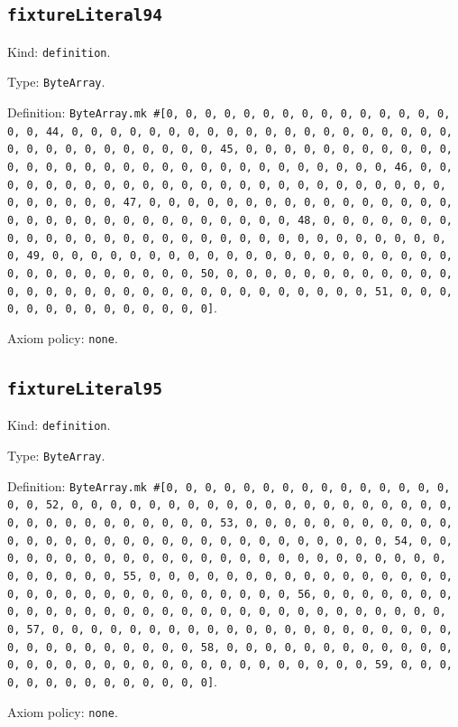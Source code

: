 \documentclass[11pt]{article}
\begin{document}
\subsection*{\texttt{fixtureLiteral94}}
\noindent Kind: \texttt{definition}.\par
\noindent Type: \texttt{ByteArray}.\par
\noindent Definition: \texttt{ByteArray.mk \#[0, 0, 0, 0, 0, 0, 0, 0, 0, 0, 0, 0, 0, 0, 0, 0, 0, 44, 0, 0, 0, 0, 0, 0, 0, 0, 0, 0, 0, 0, 0, 0, 0, 0, 0, 0, 0, 0, 0, 0, 0, 0, 0, 0, 0, 0, 0, 0, 0, 45, 0, 0, 0, 0, 0, 0, 0, 0, 0, 0, 0, 0, 0, 0, 0, 0, 0, 0, 0, 0, 0, 0, 0, 0, 0, 0, 0, 0, 0, 0, 0, 46, 0, 0, 0, 0, 0, 0, 0, 0, 0, 0, 0, 0, 0, 0, 0, 0, 0, 0, 0, 0, 0, 0, 0, 0, 0, 0, 0, 0, 0, 0, 0, 47, 0, 0, 0, 0, 0, 0, 0, 0, 0, 0, 0, 0, 0, 0, 0, 0, 0, 0, 0, 0, 0, 0, 0, 0, 0, 0, 0, 0, 0, 0, 0, 48, 0, 0, 0, 0, 0, 0, 0, 0, 0, 0, 0, 0, 0, 0, 0, 0, 0, 0, 0, 0, 0, 0, 0, 0, 0, 0, 0, 0, 0, 0, 0, 49, 0, 0, 0, 0, 0, 0, 0, 0, 0, 0, 0, 0, 0, 0, 0, 0, 0, 0, 0, 0, 0, 0, 0, 0, 0, 0, 0, 0, 0, 0, 0, 50, 0, 0, 0, 0, 0, 0, 0, 0, 0, 0, 0, 0, 0, 0, 0, 0, 0, 0, 0, 0, 0, 0, 0, 0, 0, 0, 0, 0, 0, 0, 0, 51, 0, 0, 0, 0, 0, 0, 0, 0, 0, 0, 0, 0, 0, 0]}.\par
\noindent Axiom policy: \texttt{none}.\par
\subsection*{\texttt{fixtureLiteral95}}
\noindent Kind: \texttt{definition}.\par
\noindent Type: \texttt{ByteArray}.\par
\noindent Definition: \texttt{ByteArray.mk \#[0, 0, 0, 0, 0, 0, 0, 0, 0, 0, 0, 0, 0, 0, 0, 0, 0, 52, 0, 0, 0, 0, 0, 0, 0, 0, 0, 0, 0, 0, 0, 0, 0, 0, 0, 0, 0, 0, 0, 0, 0, 0, 0, 0, 0, 0, 0, 0, 0, 53, 0, 0, 0, 0, 0, 0, 0, 0, 0, 0, 0, 0, 0, 0, 0, 0, 0, 0, 0, 0, 0, 0, 0, 0, 0, 0, 0, 0, 0, 0, 0, 54, 0, 0, 0, 0, 0, 0, 0, 0, 0, 0, 0, 0, 0, 0, 0, 0, 0, 0, 0, 0, 0, 0, 0, 0, 0, 0, 0, 0, 0, 0, 0, 55, 0, 0, 0, 0, 0, 0, 0, 0, 0, 0, 0, 0, 0, 0, 0, 0, 0, 0, 0, 0, 0, 0, 0, 0, 0, 0, 0, 0, 0, 0, 0, 56, 0, 0, 0, 0, 0, 0, 0, 0, 0, 0, 0, 0, 0, 0, 0, 0, 0, 0, 0, 0, 0, 0, 0, 0, 0, 0, 0, 0, 0, 0, 0, 57, 0, 0, 0, 0, 0, 0, 0, 0, 0, 0, 0, 0, 0, 0, 0, 0, 0, 0, 0, 0, 0, 0, 0, 0, 0, 0, 0, 0, 0, 0, 0, 58, 0, 0, 0, 0, 0, 0, 0, 0, 0, 0, 0, 0, 0, 0, 0, 0, 0, 0, 0, 0, 0, 0, 0, 0, 0, 0, 0, 0, 0, 0, 0, 59, 0, 0, 0, 0, 0, 0, 0, 0, 0, 0, 0, 0, 0, 0]}.\par
\noindent Axiom policy: \texttt{none}.\par
\end{document}
